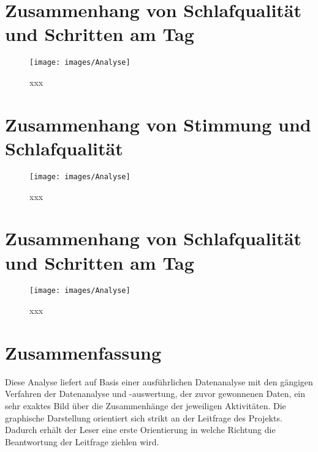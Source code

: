 \section{Zusammenhang von Schlafqualität und Schritten am Tag}
\label{ch:AnalyseUndEvaluierung:sec:ZusammenhangVonSchlafqualitätUndSchrittenAmTag}

\begin{figure}[H]
\centering
        \texttt{[image: images/Analyse]} 
        \caption[xxx]{xxx}
        \label{fig:xxxx}
\end{figure}

\section{Zusammenhang von Stimmung und Schlafqualität}
\label{ch:AnalyseUndEvaluierung:sec:KorrelationVonSchlafqualitätUndSchrittenAmTag}

\begin{figure}[H]
\centering
        \texttt{[image: images/Analyse]} 
        \caption[xxx]{xxx}
        \label{fig:xxxx}
\end{figure}

\section{Zusammenhang von Schlafqualität und Schritten am Tag}
\label{ch:AnalyseUndEvaluierung:sec:KorrelationVonSchlafqualitätUndSchrittenAmTag}

\begin{figure}[H]
\centering
        \texttt{[image: images/Analyse]} 
        \caption[xxx]{xxx}
        \label{fig:xxxx}
\end{figure}

\section{Zusammenfassung}
\label{ch:Analyse:sec:zusammenfassung}

Diese Analyse liefert auf Basis einer ausführlichen Datenanalyse mit den gängigen Verfahren der Datenanalyse und -auswertung, der zuvor gewonnenen Daten, ein sehr exaktes Bild über die Zusammenhänge der jeweiligen Aktivitäten.
Die graphische Darstellung orientiert sich strikt an der Leitfrage des Projekts. 
Dadurch erhält der Leser eine erste Orientierung in welche Richtung die Beantwortung der Leitfrage ziehlen wird.

